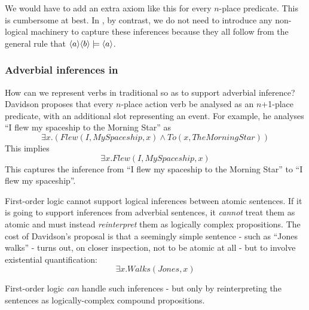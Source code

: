 \NI We would have to add an extra  axiom like this for every
$n$-place predicate.  This is cumbersome at best.  In \cathoristic{}, by
contrast, we do not need to introduce any non-logical machinery 
to capture these inferences because they all follow from the general
rule that $\MAY{a} \MAY{b} \models \MAY{a}$.

\subsubsection{Adverbial inferences in \fol{}}

\NI How can we represent verbs in traditional \fol{} so as to
support adverbial inference?  Davidson \cite{davidson2} proposes that
every $n$-place action verb be analysed as an $n$+1-place predicate,
with an additional slot representing an event.  For example, he
analyses ``I flew my spaceship to the Morning Star'' as
\[
\exists x. ( Flew(I, MySpaceship, x) \land To(x, TheMorningStar))
\]
This implies 
\[
\exists x.  Flew(I, MySpaceship, x)
\]
This captures the inference from ``I flew my spaceship to the Morning
Star'' to ``I flew my spaceship''.

First-order logic cannot support logical inferences between atomic
sentences.  If it is going to support inferences from adverbial
sentences, it \emph{cannot} treat them as atomic and must instead
\emph{reinterpret} them as logically complex propositions.  The cost
of Davidson's proposal is that a seemingly simple sentence - such as
``Jones walks'' - turns out, on closer inspection, not to be atomic at
all - but to involve existential quantification:
\[
\exists x.  Walks(Jones, x)
\]

\NI First-order logic \emph{can} handle such inferences - but only by
reinterpreting the sentences as logically-complex compound
propositions.
